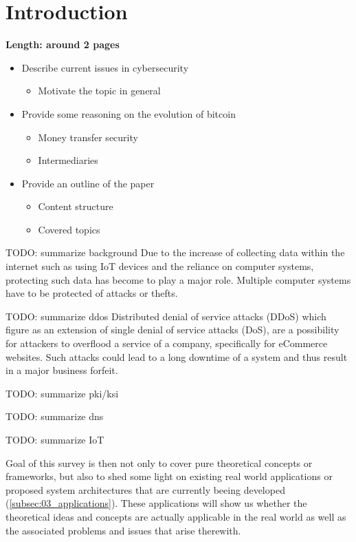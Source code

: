 \section{Introduction}

\textbf{Length: around 2 pages}

\begin{itemize}
  \item Describe current issues in cybersecurity
  \begin{itemize}
    \item Motivate the topic in general
  \end{itemize}
  \item Provide some reasoning on the evolution of bitcoin
  \begin{itemize}
    \item Money transfer security
    \item Intermediaries
  \end{itemize}
  \item Provide an outline of the paper
  \begin{itemize}
    \item Content structure
    \item Covered topics
  \end{itemize}
\end{itemize}

TODO: summarize background
Due to the increase of collecting data within the internet such as using IoT devices and the reliance on computer systems, protecting such data has become to play a major role. Multiple computer systems have to be protected of attacks or thefts.


TODO: summarize ddos
Distributed denial of service attacks (DDoS) which figure as an extension of single denial of service attacks (DoS), are a possibility for attackers to overflood a service of a company, specifically for eCommerce websites. Such attacks could lead to a long downtime of a system and thus result in a major business forfeit.

TODO: summarize pki/ksi

TODO: summarize dns

TODO: summarize IoT

Goal of this survey is then not only to cover pure theoretical concepts or frameworks, but also to shed some light on existing real world applications or proposed system architectures that are currently beeing developed (\ref{subsec:03_applications}). These applications will show us whether the theoretical ideas and concepts are actually applicable in the real world as well as the associated problems and issues that arise therewith.

